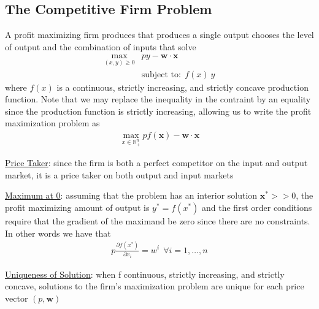 \documentclass{article}
\begin{document}
\subsection{The Competitive Firm Problem}
A profit maximizing firm produces that produces a single output chooses the level of output and the combination of inputs that solve
\begin{align*}
  \max_{(x,y) \geq 0} &py - \mathbf{w} \cdot \mathbf{x} \\
  &\text{subject to:} \ \ f(x) \ y
\end{align*}
where $f(x)$ is a continuous, strictly increasing, and strictly concave production function. Note that we may replace the inequality in the contraint by an equality since the production function is strictly increasing, allowing us to write the profit maximization problem as
\begin{gather*}
  \max_{x \in \mathbb{R}_{+}^{n}} pf(\mathbf{x}) - \mathbf{w} \cdot \mathbf{x}
\end{gather*}
\par \vspace{0.3em}
  \underline{Price Taker}: since the firm is both a perfect competitor on the input and output market, it is a price taker on both output and input markets
  \par
  \underline{Maximum at 0}: assuming that the problem has an interior solution $\mathbf{x}^{*} >>0$, the profit maximizing amount of output is $y^{*} = f(x^{*})$ and the first order conditions require that the gradient of the maximand be zero since there are no constraints. In other words we have that
  \begin{gather*}
    p \frac{\partial f(x^{*})}{\partial x_{i}} = w^{i} \ \ \forall i = 1, \dots, n
  \end{gather*}
  \par
  \underline{Uniqueness of Solution}: when f continuous, strictly increasing, and strictly concave, solutions to the firm's maximization problem are unique for each price vector $(p, \mathbf{w})$
\end{document}
